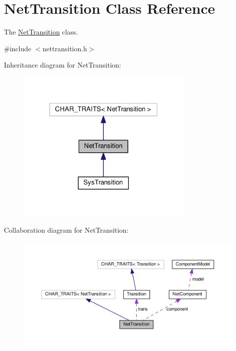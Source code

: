 \hypertarget{class_net_transition}{}\section{Net\+Transition Class Reference}
\label{class_net_transition}


The \hyperlink{class_net_transition}{Net\+Transition} class.  




{\ttfamily \#include $<$nettransition.\+h$>$}



Inheritance diagram for Net\+Transition\+:
\nopagebreak
\begin{figure}[H]
\begin{center}
\leavevmode
\includegraphics[width=244pt]{class_net_transition__inherit__graph}
\end{center}
\end{figure}


Collaboration diagram for Net\+Transition\+:
\nopagebreak
\begin{figure}[H]
\begin{center}
\leavevmode
\includegraphics[width=350pt]{class_net_transition__coll__graph}
\end{center}
\end{figure}

